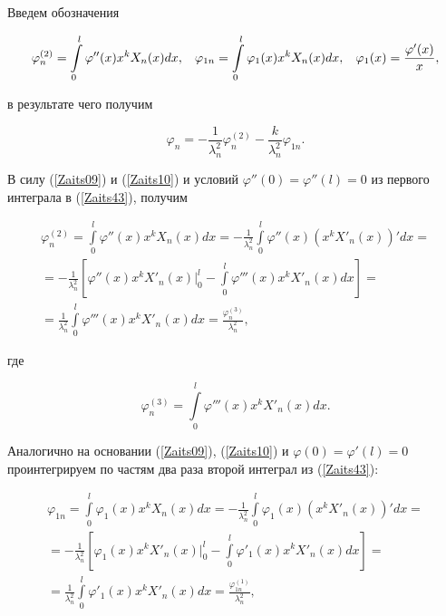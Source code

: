Введем обозначения

\begin{equation}

\label{Zaits43}

\varphi_n^{(2)}=\int\limits_0^l\varphi''(x)x^kX_n(x)dx,\hskip3mm \varphi_{1n}=\int\limits_0^l\varphi_1(x)x^kX_n(x)dx,\hskip3mm \varphi_1(x)=\frac{\varphi'(x)}{x},

\end{equation}

в результате чего получим

\begin{equation}

\label{Zaits44}

\varphi_n=-\frac{1}{\lambda_n^2}\varphi_n^{(2)}-\frac{k}{\lambda_n^2}\varphi_{1n}.

\end{equation}



В силу (\ref{Zaits09}) и (\ref{Zaits10}) и условий $\varphi''(0)=\varphi''(l)=0$ из первого интеграла в (\ref{Zaits43}), получим

\begin{multline}

\label{Zaits45}

\varphi_n^{(2)}=\int\limits_0^l\varphi''(x)x^kX_n(x)dx=-\frac{1}{\lambda_n^2}\int\limits_0^l\varphi''(x)\left(x^kX'_n(x)\right)'dx=\\

=-\frac{1}{\lambda_n^2}\left[\varphi''(x)x^kX'_n(x)\Bigr|_0^l-\int\limits_0^l\varphi'''(x)x^kX'_n(x)dx\right]=\\

=\frac{1}{\lambda_n^2}\int\limits_0^l\varphi'''(x)x^kX'_n(x)dx=\frac{\varphi_n^{(3)}}{\lambda_n^2},

\end{multline}

где

$$\varphi_n^{(3)}=\int\limits_0^l\varphi'''(x)x^kX'_n(x)dx.$$



Аналогично на основании (\ref{Zaits09}), (\ref{Zaits10}) и $\varphi(0)=\varphi'(l)=0$ проинтегрируем по частям два раза второй интеграл из (\ref{Zaits43}):

\begin{multline}

\label{Zaits46}

\varphi_{1n}=\int\limits_0^l\varphi_1(x)x^kX_n(x)dx=-\frac{1}{\lambda_n^2}\int\limits_0^l\varphi_1(x)\left(x^kX'_n(x)\right)'dx=\\

=-\frac{1}{\lambda_n^2}\left[\varphi_1(x)x^kX'_n(x)\Bigr|_0^l-\int\limits_0^l\varphi'_1(x)x^kX'_n(x)dx\right]=\\

=\frac{1}{\lambda_n^2}\int\limits_0^l\varphi'_1(x)x^kX'_n(x)dx=\frac{\varphi_{1n}^{(1)}}{\lambda_n^2},

\end{multline}


